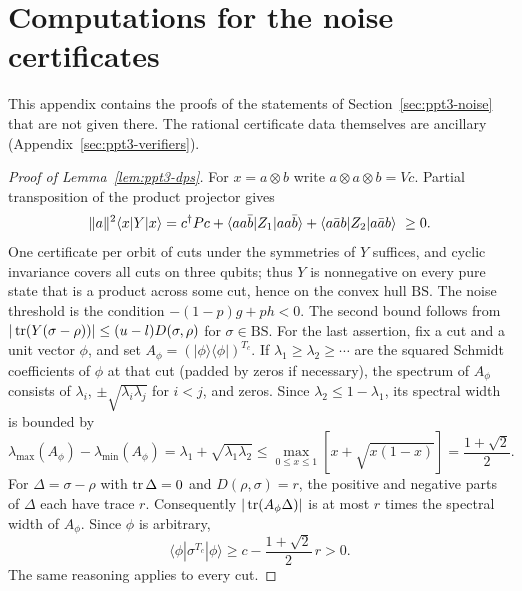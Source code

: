 \section{Computations for the noise certificates}\label{sec:ppt3-app-noise}

This appendix contains the proofs of the statements of Section~\ref{sec:ppt3-noise} that are not given there. The rational certificate data
themselves are ancillary (Appendix~\ref{sec:ppt3-verifiers}).

\begin{proof}[Proof of Lemma~\ref{lem:ppt3-dps}]
For $x=a\otimes b$ write $a\otimes a\otimes b=Vc$. Partial transposition of the product projector gives
\[
\|a\|^2\langle x|Y|x\rangle=c\dg Pc+\langle a a\bar b|Z_1|a a\bar b\rangle+\langle a\bar a b|Z_2|a\bar a b\rangle\ \ge0 .
\]
One certificate per orbit of cuts under the symmetries of $Y$ suffices, and cyclic invariance covers all cuts on
three qubits; thus $Y$ is nonnegative on every pure state that is a product across some cut, hence on the convex hull
$\mathrm{BS}$. The noise threshold is the condition $-(1-p)g+ph<0$. The second bound follows from
$|\operatorname{tr}(Y(\sigma-\rho))|\le(u-l)D(\sigma,\rho)$ for $\sigma\in\mathrm{BS}$. For the last assertion, fix a cut and a unit vector
$\phi$, and set $A_\phi=(|\phi\rangle\langle\phi|)^{T_c}$.
If $\lambda_1\ge\lambda_2\ge\cdots$ are the squared
Schmidt coefficients of $\phi$ at that cut (padded by zeros if necessary), the spectrum
of $A_\phi$ consists of $\lambda_i$,
$\pm\sqrt{\lambda_i\lambda_j}$ for $i<j$, and zeros.
Since $\lambda_2\le1-\lambda_1$, its spectral width is bounded by
\[
\lambda_{\max}(A_\phi)-\lambda_{\min}(A_\phi)
=\lambda_1+\sqrt{\lambda_1\lambda_2}
\le\max_{0\le x\le1}\left[x+\sqrt{x(1-x)}\right]
=\frac{1+\sqrt2}{2}.
\]
For $\Delta=\sigma-\rho$ with $\operatorname{tr}\Delta=0$ and
$D(\rho,\sigma)=r$, the positive and negative parts
of $\Delta$ each have trace $r$. Consequently
$|\operatorname{tr}(A_\phi\Delta)|$ is at most $r$ times the
spectral width of $A_\phi$. Since $\phi$ is arbitrary,
\[
 \langle\phi|\sigma^{T_c}|\phi\rangle
 \ge c-\frac{1+\sqrt2}{2}\,r>0.
\]
The same reasoning applies to every cut.
\end{proof}

